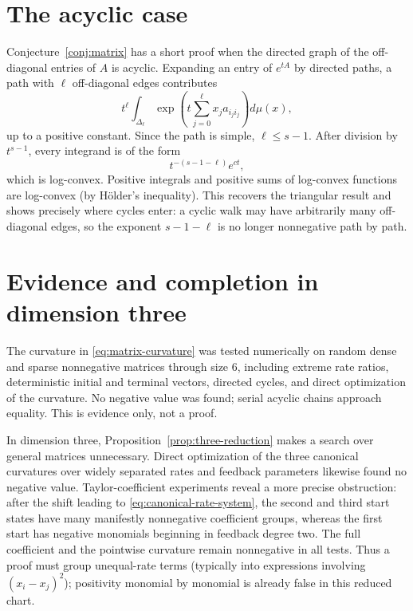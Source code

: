 \documentclass[11pt]{article}
\theoremstyle{remark}
\begin{document}
\section{The acyclic case}

Conjecture~\ref{conj:matrix} has a short proof when the directed graph of the
off-diagonal entries of \(A\) is acyclic.  Expanding an entry of \(e^{tA}\) by
directed paths, a path with \(\ell\) off-diagonal edges contributes
\[
  t^\ell
  \int_{\Delta_\ell}
  \exp\!\left(t\sum_{j=0}^{\ell}x_j a_{i_ji_j}\right)d\mu(x),
\]
up to a positive constant.  Since the path is simple, \(\ell\leq s-1\).
After division by \(t^{s-1}\), every integrand is of the form
\[
  t^{-(s-1-\ell)}e^{ct},
\]
which is log-convex.  Positive integrals and positive sums of log-convex
functions are log-convex (by H\"older's inequality).  This recovers the
triangular result and shows precisely where cycles enter: a cyclic walk may have
arbitrarily many off-diagonal edges, so the exponent \(s-1-\ell\) is no longer
nonnegative path by path.

\section{Evidence and completion in dimension three}

The curvature in \eqref{eq:matrix-curvature} was tested numerically on random
dense and sparse nonnegative matrices through size \(6\), including extreme rate
ratios, deterministic initial and terminal vectors, directed cycles, and direct
optimization of the curvature.  No negative value was found; serial acyclic
chains approach equality.  This is evidence only, not a proof.

In dimension three, Proposition~\ref{prop:three-reduction} makes a search over
general matrices unnecessary.  Direct optimization of the three canonical
curvatures over widely separated rates and feedback parameters likewise found
no negative value.  Taylor-coefficient experiments reveal a more precise
obstruction: after the shift leading to \eqref{eq:canonical-rate-system}, the
second and third start states have many manifestly nonnegative coefficient
groups, whereas the first start has negative monomials beginning in feedback
degree two.  The full coefficient and the pointwise curvature remain
nonnegative in all tests.  Thus a proof must group unequal-rate terms (typically
into expressions involving $(x_i-x_j)^2$); positivity monomial by monomial is
already false in this reduced chart.
\end{document}
